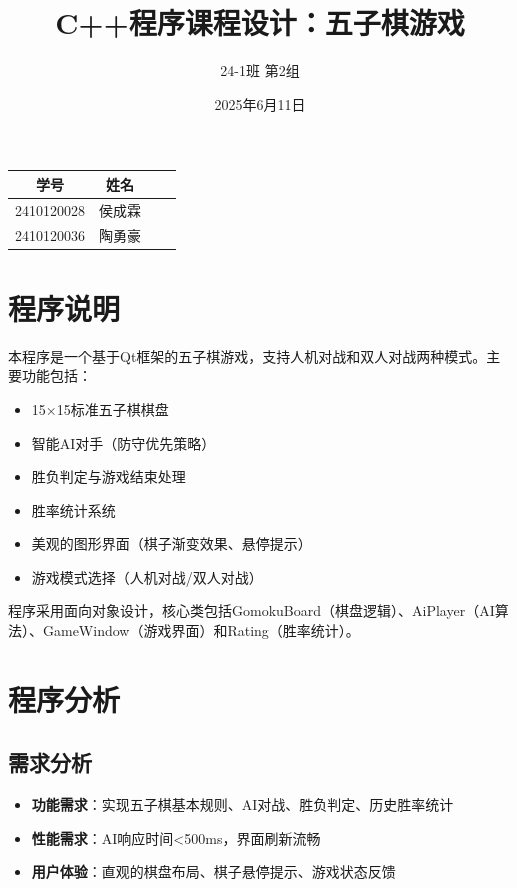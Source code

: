 \documentclass[UTF8]{ctexart}
\begin{document}
\title{C++程序课程设计：五子棋游戏}
\author{24-1班 第2组}
\date{2025年6月11日}

\maketitle
\begin{center}
    \begin{tabular}{|c|c|c|c|}
        \hline
        \textbf{学号} & \textbf{姓名}  \\
        \hline
        2410120028 & 侯成霖 \\
        \hline
        2410120036 & 陶勇豪 \\
        \hline
    \end{tabular}
\end{center}

\tableofcontents
\newpage

\section{程序说明}
本程序是一个基于Qt框架的五子棋游戏，支持人机对战和双人对战两种模式。主要功能包括：
\begin{itemize}
    \item 15×15标准五子棋棋盘
    \item 智能AI对手（防守优先策略）
    \item 胜负判定与游戏结束处理
    \item 胜率统计系统
    \item 美观的图形界面（棋子渐变效果、悬停提示）
    \item 游戏模式选择（人机对战/双人对战）
\end{itemize}

程序采用面向对象设计，核心类包括GomokuBoard（棋盘逻辑）、AiPlayer（AI算法）、GameWindow（游戏界面）和Rating（胜率统计）。

\section{程序分析}
\subsection{需求分析}
\begin{itemize}
    \item \textbf{功能需求}：实现五子棋基本规则、AI对战、胜负判定、历史胜率统计
    \item \textbf{性能需求}：AI响应时间<500ms，界面刷新流畅
    \item \textbf{用户体验}：直观的棋盘布局、棋子悬停提示、游戏状态反馈
\end{itemize}
\end{document}
